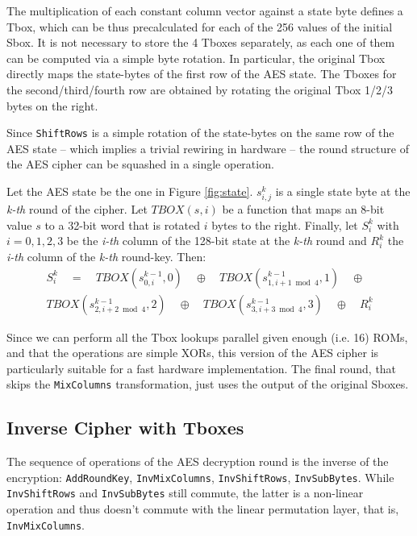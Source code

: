 The multiplication of each constant column vector against a state byte defines
a Tbox, which can be thus precalculated for each of the 256 values of the initial
Sbox.
It is not necessary to store the 4 Tboxes separately, as each one of them can be
computed via a simple byte rotation.
In particular, the original Tbox directly maps the state-bytes of the first row of
the AES state. The Tboxes for the second/third/fourth row are obtained by rotating
the original Tbox 1/2/3 bytes on the right.

Since \texttt{ShiftRows} is a simple rotation of the state-bytes on the same row of
the AES state -- which implies a trivial rewiring in hardware -- the round structure
of the AES cipher can be squashed in a single operation.

Let the AES state be the one in Figure \ref{fig:state}.
$s^k_{i,j}$ is a single state byte at the \textit{k-th} round of the cipher.
Let $ TBOX(s,i) $ be a function that maps an 8-bit value $s$ to a 32-bit word that
is rotated $i$ bytes to the right.
Finally, let $S_i^k$ with $i=0,1,2,3$ be the \textit{i-th} column of the 128-bit
state at the \textit{k-th} round and $R^k_i$ the \textit{i-th} column of the \textit{k-th} round-key.
Then:
\begin{equation}
  \begin{align*}
    S_i^k\quad =\quad TBOX(s^{k-1}_{0,i},0)\quad \oplus\quad TBOX(s^{k-1}_{1,i+1\bmod4},1)\quad \oplus \\
      TBOX(s^{k-1}_{2,i+2\bmod4},2)\quad \oplus\quad TBOX(s^{k-1}_{3,i+3\bmod4},3)\quad \oplus\quad R^k_i
  \end{align*}
  \label{eq:tbox}
\end{equation}

Since we can perform all the Tbox lookups parallel given enough (i.e. 16) ROMs,
and that the operations are simple XORs, this version of the AES cipher is particularly suitable
for a fast hardware implementation.
The final round, that skips the \texttt{MixColumns} transformation, just uses the
output of the original Sboxes.

\subsection{Inverse Cipher with Tboxes}
\label{sec:inv_tbox}

The sequence of operations of the AES decryption round is the inverse of the encryption:
\texttt{AddRoundKey}, \texttt{InvMixColumns}, \texttt{InvShiftRows}, \texttt{InvSubBytes}.
While \texttt{InvShiftRows} and \texttt{InvSubBytes} still commute, the latter is a non-linear
operation and thus doesn't commute with the linear permutation layer, that is, \texttt{InvMixColumns}.

